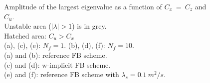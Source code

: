 \documentclass[a4paper]{article}
\numberwithin{equation}{section}
\begin{document}
\begin{figure}[!ht]
   \quad
   \caption{Amplitude of the largest eigenvalue as a function of $C_x\ =\ C_z$ and $C_u$.\\
       Unstable area ($\mid\lambda\mid >1$) is in grey.\\
       Hatched area: $C_u > C_x$ \\
       (a), (c), (e): $N_f = 1$. (b), (d), (f): $N_f = 10$.\\
       (a) and (b): reference FB scheme.\\
       (c) and (d): w-implicit FB scheme.\\
       (e) and (f): reference FB scheme with $\lambda_s = 0.1\ m^2/s$.}
   \label{Figstabadv}
\end{figure}


\end{document}
